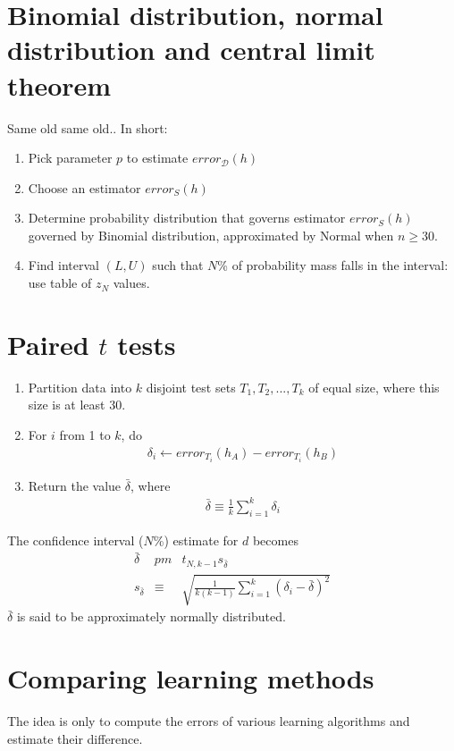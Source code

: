 \section{Binomial distribution, normal distribution and central limit theorem}
Same old same old.. In short:
\begin{enumerate}
	\item Pick parameter $p$ to estimate $error_{\mathcal{D}} (h)$
	\item Choose an estimator $error_S(h)$
	\item Determine probability distribution that governs estimator $error_S(h)$ governed by Binomial distribution, approximated by Normal when $n \geq 30$.
	\item Find interval $(L, U)$ such that $N$\% of probability mass falls in the interval: use table of $z_N$ values.

\end{enumerate}

\section{Paired $t$ tests}
\begin{enumerate}
	\item Partition data into $k$ disjoint test sets $T_1, T_2, ..., T_k$ of equal size, where this size is at least 30.
	\item For $i$ from 1 to $k$, do 
	\begin{eqnarray}
		\delta_i \leftarrow error_{T_i} (h_A) - error_{T_i} (h_B)
	\end{eqnarray}
	\item Return the value $\bar{\delta}$, where
	\begin{eqnarray}
		\bar{\delta} \equiv \frac{1}{k} \sum^{k}_{i = 1} \delta_i 
	\end{eqnarray}
\end{enumerate}
The confidence interval ($N$\%) estimate for $d$ becomes
\begin{eqnarray}
	\bar{\delta} &pm& t_{N, k-1} s_{\bar{\delta}} \\
	s_{\bar{\delta}} &\equiv& \sqrt{\frac{1}{k(k-1)} \sum^{k}_{i = 1} (\delta_i - \bar{\delta})^2}
\end{eqnarray}
$\bar{\delta}$ is said to be approximately normally distributed.
\section{Comparing learning methods}
The idea is only to compute the errors of various learning algorithms and estimate their difference.
